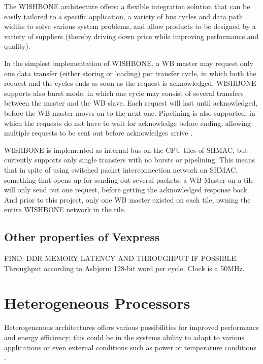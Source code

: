 The WISHBONE architecture offers: a flexible integration solution that can be easily tailored to a specific application, a variety of bus cycles and data path widths to solve various system problems, and allow products to be designed by a variety of suppliers (thereby driving down price while improving performance and quality).

In the simplest implementation of WISHBONE, a WB master may request only one data transfer (either storing or loading) per transfer cycle, in which both the request and the cycles ends as soon as the request is acknowledged.
WISHBONE supports also burst mode, in which one cycle may consist of several transfers between the master and the WB slave.
Each request will last until acknowledged, before the WB master moves on to the next one.
Pipelining is also supported, in which the requests do not have to wait for acknowledge before ending, allowing multiple requests to be sent out before acknowledges arrive \cite{WISHBONE}.

WISHBONE is implemented as internal bus on the CPU tiles of SHMAC, but currently supports only single transfers with no bursts or pipelining.
This means that in spite of using switched packet interconnection network on SHMAC, something that opens up for sending out several packets, a WB Master on a tile will only send out one request, before getting the acknowledged response back.
\cite{Yaman}
And prior to this project, only one WB master existed on each tile, owning the entire WISHBONE network in the tile.

\subsection{Other properties of Vexpress}
FIND: DDR MEMORY LATENCY AND THROUGHPUT IF POSSIBLE.
Throughput according to Asbjørn: 128-bit word per cycle.
Clock is a 50MHz.

\section{Heterogeneous Processors}

Heterogenenous architectures offers various possibilities for improved performance and energy efficiency;
this could be in the systems ability to adapt to various applications or even external conditions such as
power or temperature conditions \cite{heterogeneous-ee, heterogeneous-perf, heterogeneous-arch}.

